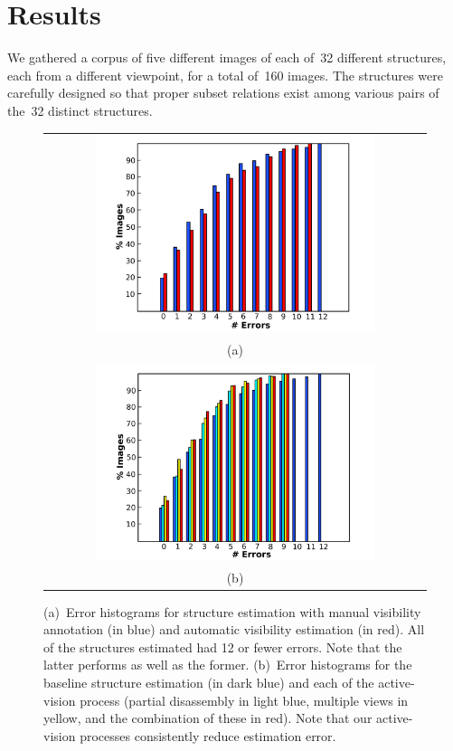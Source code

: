 \section{Results}
\label{sec:results}

We gathered a corpus of five different images of each of~32 different structures,
each from a different viewpoint, for a total of~160 images.
%
The structures were carefully designed so that proper subset relations exist
among various pairs of the~32 distinct structures.

\begin{figure}
  \centering
  \begin{tabular}{@{}c@{}}
    \includegraphics[width=0.75\textwidth]{images/visibility}\\
    (a)\\
    \includegraphics[width=0.75\textwidth]{images/active-vision}\\
    (b)
  \end{tabular}
  \par\vspace*{-2ex}
  \caption{(a)~Error histograms for structure estimation with manual visibility
    annotation (in blue) and automatic visibility estimation (in red).
    All of the structures estimated had 12 or fewer errors.
    Note that the latter performs as well as the former.
    (b)~Error histograms for the baseline structure estimation (in dark blue)
    and each of the active-vision process (partial disassembly in light blue,
    multiple views in yellow, and the combination of these in red).
    Note that our active-vision processes consistently reduce estimation
    error.}
  \label{fig:visibility}
  \par\vspace*{-6ex}
\end{figure}

